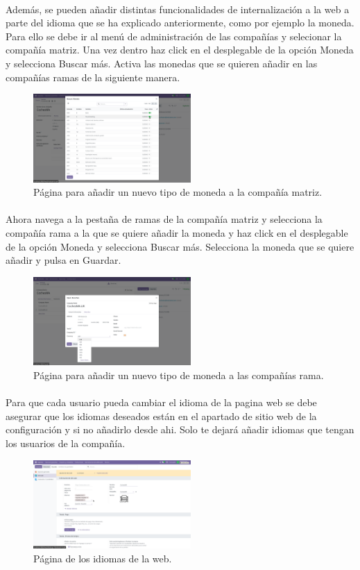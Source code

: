 \documentclass[paper=a4wide, fontsize=11pt]{report}	 %
\begin{document}
\paragraph{}
Además, se pueden añadir distintas funcionalidades de internalización a la web a parte del idioma que se ha explicado anteriormente, como por ejemplo la moneda.
Para ello se debe ir al menú de administración de las compañías y selecionar la compañía matriz. Una vez dentro haz click en el desplegable de la opción Moneda y selecciona Buscar más. Activa las monedas que se quieren añadir en las compañías ramas de la siguiente manera.
\begin{figure}[h]
    \centering
    \includegraphics[width=6cm]{currencyMatriz.png}
    \caption{Página para añadir un nuevo tipo de moneda a la compañía matriz.}
    \label{fig:faqs}
\end{figure}
\paragraph{}
Ahora navega a la pestaña de ramas de la compañía matriz y selecciona la compañía rama a la que se quiere añadir la moneda y haz click en el desplegable de la opción Moneda y selecciona Buscar más. Selecciona la moneda que se quiere añadir y pulsa en Guardar.
\begin{figure}[h]
    \centering
    \includegraphics[width=6cm]{currency.png}
    \caption{Página para añadir un nuevo tipo de moneda a las compañías rama.}
    \label{fig:faqs}
\end{figure}
\paragraph{}
Para que cada usuario pueda cambiar el idioma de la pagina web se debe asegurar que los idiomas deseados están en el apartado de sitio web de la configuración y si no añadirlo desde ahi. Solo te dejará añadir idiomas que tengan los usuarios de la compañía.
\newpage
\begin{figure}[h]
    \centering
    \includegraphics[width=6cm]{idiomasCompañia.png}
    \caption{Página de los idiomas de la web.}
    \label{fig:faqs}
\end{figure}
\end{document}
